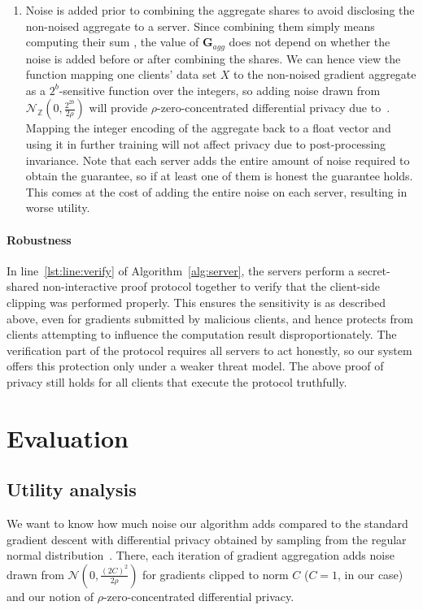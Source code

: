 \documentclass{article}
\begin{document}
\begin{enumerate}
\item Noise is added prior to combining the aggregate shares to avoid disclosing the non-noised aggregate to a server. Since combining them simply means computing their sum \cite[Step 3 of Scheme on page 3]{prio}, the value of $\textbf{G}_{agg}$ does not depend on whether the noise is added before or after combining the shares. We can hence view the function mapping one clients' data set $X$ to the non-noised gradient aggregate as a $2^b$-sensitive function over the integers, so adding noise drawn from $\mathcal N_\mathbb{Z}\left(0,\frac{2^{2b}}{2\rho}\right)$ will provide $\rho$-zero-concentrated differential privacy due to~\cite[Theorem 14 on page 15, with all $\sigma_j=\frac{2^{2b}}{2\rho}$]{DBLP:journals/corr/abs-2004-00010}. Mapping the integer encoding of the aggregate back to a float vector and using it in further training will not affect privacy due to post-processing invariance. Note that each server adds the entire amount of noise required to obtain the guarantee, so if at least one of them is honest the guarantee holds. This comes at the cost of adding the entire noise on each server, resulting in worse utility.
\end{enumerate}

\paragraph{Robustness}
In line~\ref{lst:line:verify} of Algorithm~\ref{alg:server}, the servers perform a secret-shared non-interactive proof protocol \cite[Section 4]{prio} together to verify that the client-side clipping was performed properly. This ensures the sensitivity is as described above, even for gradients submitted by malicious clients, and hence protects from clients attempting to influence the computation result disproportionately. The verification part of the protocol requires all servers to act honestly, so our system offers this protection only under a weaker threat model. The above proof of privacy still holds for all clients that execute the protocol truthfully.

\section{Evaluation}

\subsection{Utility analysis}
We want to know how much noise our algorithm adds compared to the standard gradient descent with differential privacy obtained by sampling from the regular normal distribution~\cite{Abadi_2016}. There, each iteration of gradient aggregation adds noise drawn from $\mathcal N\left(0,\frac{(2C)^2}{2\rho}\right)$ for gradients clipped to norm $C$ ($C=1$, in our case) and our notion of $\rho$-zero-concentrated differential privacy.
\end{document}
